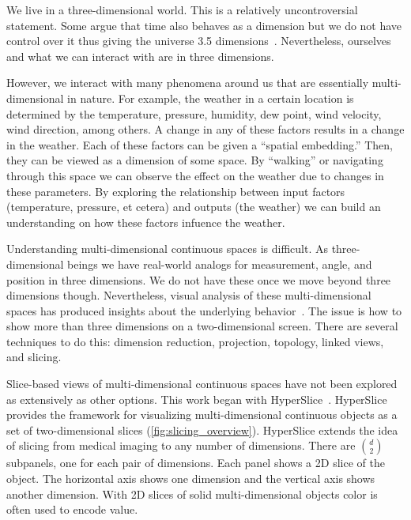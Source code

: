 
We live in a three-dimensional world. This is a relatively uncontroversial
statement. Some argue that time also behaves as a dimension but we do not have
control over it thus giving the universe 3.5 dimensions~\cite{Minkowski:1908}.
Nevertheless, ourselves and what we can interact with are in three dimensions.

However, we interact with many phenomena around us that are essentially
multi-dimensional in nature. For example, the weather in a certain location is
determined by the temperature, pressure, humidity, dew point, wind velocity,
wind direction, among others. A change in any of these factors results in a
change in the weather. Each of these factors can be given a ``spatial
embedding.'' Then, they can be viewed as a dimension of some space.  By
``walking'' or navigating through this space we can observe the effect on the
weather due to changes in these parameters. By exploring the relationship
between input factors (temperature, pressure, et cetera) and outputs (the
weather) we can build an understanding on how these factors infuence the
weather.

Understanding multi-dimensional continuous spaces is difficult. As
three-dimensional beings we have real-world analogs for measurement,
angle, and position in three dimensions. We do not have these once we
move beyond three dimensions though. Nevertheless, visual analysis of
these multi-dimensional spaces has produced insights about the
underlying behavior~\cite{Sedlmair:2014}. The issue is how to show more
than three dimensions on a two-dimensional screen. There are several
techniques to do this: dimension reduction, projection, 
topology, linked views, and slicing.

Slice-based views of multi-dimensional continuous spaces have not been explored
as extensively as other options.  This work began with
HyperSlice~\cite{Wijk:1993}. HyperSlice provides the framework for visualizing
multi-dimensional continuous objects as a set of two-dimensional slices
(\autoref{fig:slicing_overview}). HyperSlice extends the idea of slicing
from medical imaging to any number of dimensions. There are $d \choose 2$
subpanels, one for each pair of dimensions. Each panel shows a 2D slice
of the object. The horizontal axis shows one dimension and the vertical 
axis shows another dimension. With 2D slices of solid multi-dimensional objects
color is often used to encode value. 

